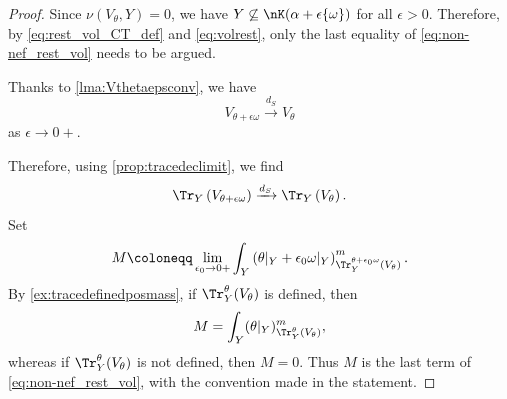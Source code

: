 \begin{proof} Since $\nu(V_\theta, Y)=0$, we have $Y\not\subseteq \nK(\alpha+\epsilon\{\omega\})$ for all $\epsilon>0$. Therefore, by \eqref{eq:rest_vol_CT_def} and \eqref{eq:volrest}, only the last equality of \eqref{eq:non-nef_rest_vol} needs to be argued.

Thanks to \cref{lma:Vthetaepsconv}, we have
\[
    V_{\theta+\epsilon\omega}\xrightarrow{d_S}V_{\theta}
\]
as $\epsilon\to 0+$.

Therefore, using \cref{prop:tracedeclimit}, we find
\[
\Tr_Y\left( V_{\theta+\epsilon\omega} \right) \xrightarrow{d_S} \Tr_Y\left(V_{\theta}\right).
\]
Set
\[
M\coloneqq \lim_{\epsilon_0\to 0+}\int_Y \left(\theta|_Y+\epsilon_0\omega|_Y\right)^m_{\Tr_Y^{\theta+\epsilon_0\omega}(V_{\theta})}.
\]
By \cref{ex:tracedefinedposmass}, if $\Tr_Y^{\theta}(V_{\theta})$ is defined, then
\[
    M=\int_Y (\theta|_Y)^m_{\Tr_Y^{\theta}(V_{\theta})},
\]
whereas if $\Tr_Y^{\theta}(V_{\theta})$ is not defined, then $M=0$. Thus $M$ is the last term of \eqref{eq:non-nef_rest_vol}, with the convention made in the statement.


\end{proof}
